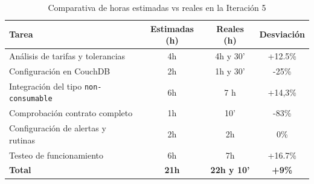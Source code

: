 \begin{table}[H]
    \centering
    \begin{tabular}{|l|c|c|c|}
        \hline
        \textbf{Tarea} & \textbf{Estimadas (h)} & \textbf{Reales (h)} & \textbf{Desviación} \\
        \hline
        Análisis de tarifas y tolerancias       & 4h  & 4h y 30' & +12.5\% \\
        Configuración en CouchDB                & 2h  & 1h y 30'  & -25\%   \\
        Integración del tipo \texttt{non-consumable} & 6h  & 7 h       & +14,3\% \\
        Comprobación contrato completo          & 1h  & 10'      & -83\%   \\
        Configuración de alertas y rutinas      & 2h  & 2h       & 0\%     \\
        Testeo de funcionamiento                & 6h  & 7h       & +16.7\% \\
        \hline
        \textbf{Total} & \textbf{21h} & \textbf{22h y 10'} & \textbf{+9\%} \\
        \hline
    \end{tabular}
    \caption{Comparativa de horas estimadas vs reales en la Iteración 5}
    \label{tab:horas-iteracion5}
\end{table}